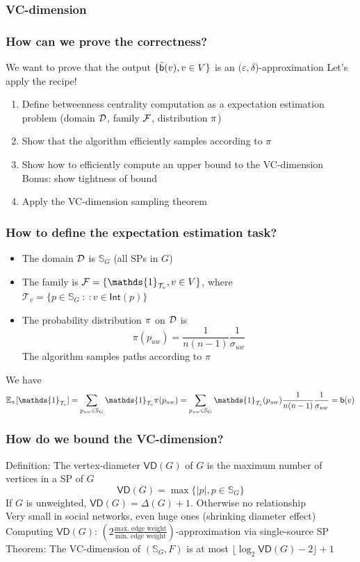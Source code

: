 \begin{frame}
  \frametitle{VC-dimension}
\end{frame}

\begin{frame}
  \frametitle{How can we prove the correctness?}
  We want to prove that the output $\{\tilde{\mathsf{b}}(v), v\in V\}$ is an
  $(\varepsilon,\delta$)-approximation
  \vfill
  Let's apply the recipe!

  \begin{enumerate}
    \item  Define betweenness centrality computation as a expectation
      estimation problem (domain ${\cal D}$, family ${\cal F}$, distribution
      $\pi$)
    \item Show that the algorithm efficiently samples according to $\pi$
    \item Show how to efficiently compute an upper bound to the VC-dimension\\
      \quad Bonus: show tightness of bound
    \item Apply the VC-dimension sampling theorem
  \end{enumerate}
\end{frame}

\begin{frame}
  \frametitle{How to define the expectation estimation task?}
  \begin{itemize}
    \item The domain ${\cal D}$ is $\mathbb{S}_G$ (all SPs in $G$)\\
    \item The family is $\family=\{\mathds{1}_{\mathcal{T}_v}, v\in V\}$,
      where $\mathcal{T}_v=\{p\in\mathbb{S}_G ~:~: v\in\mathsf{Int}(p)\}$
    \item The probability distribution $\pi$ on ${\cal D}$ is
      \[
        \pi(p_{uw})=\frac{1}{n(n-1)}\frac{1}{\sigma_{uw}}
      \]
      The algorithm samples paths according to $\pi$
  \end{itemize}
  \vfill
  We have
  \[
    \expectation_\pi[\mathds{1}_{\mathcal{T}_v}]=\sum_{p_{uw}\in\mathbb{S}_G}\mathds{1}_{\mathcal{T}_v}\pi(p_{uw})=\sum_{p_{uw}\in\mathbb{S}_G}\mathds{1}_{\mathcal{T}_v}(p_{uw})\frac{1}{n(n-1)}\frac{1}{\sigma_{uw}}=\betw(v)
  \]
\end{frame}

\begin{frame}
  \frametitle{How do we bound the VC-dimension?}
  Definition: The vertex-diameter $\mathsf{VD}(G)$ of $G$ is the maximum
  number of vertices in a SP of $G$
  \[
    \mathsf{VD}(G)=\max\{|p|, p\in\mathbb{S}_G\}
  \]
  If $G$ is unweighted, $\mathsf{VD}(G)=\Delta(G)+1$. Otherwise no relationship\\
  Very small in social networks, even huge ones (shrinking diameter effect)
  \vfill
  Computing $\mathsf{VD}(G)$: $\left(2\frac{\mbox{max.~edge weight}}{\mbox{min.~edge
  weight}}\right)$-approximation via single-source SP
  \vfill
  Theorem: The VC-dimension of $(\mathbb{S}_G,F)$ is at most $\lfloor\log_2\mathsf{VD}(G)
  -2\rfloor +1$
\end{frame}

